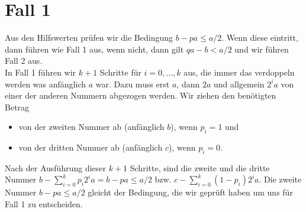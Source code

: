 \section{Fall 1} \label{case-1}
Aus den Hilfswerten prüfen wir die Bedingung $b-pa \leq a/2$. Wenn diese eintritt, dann führen wie Fall 1 aus, wenn nicht, dann gilt $qa-b < a/2$ und wir führen Fall 2 aus. \\
In Fall 1 führen wir $k+1$ Schritte für $i=0, ..., k$ aus, die immer das verdoppeln werden was anfänglich $a$ war. Dazu muss erst $a$, dann $2a$ und allgemein $2^ia$ von einer der anderen Nummern abgezogen werden. 
Wir ziehen den benötigten Betrag 
\begin{itemize}
    \item von der zweiten Nummer ab (anfänglich $b$), wenn $p_i = 1$ und
    \item von der dritten Nummer ab (anfänglich $c$), wenn $p_i = 0$.
\end{itemize}

Nach der Ausführung dieser $k+1$ Schritte, sind die zweite und die dritte Nummer $b- \sum_{i=0}^{k} p_i2^ia = b-pa \leq a/2$ bzw. $c- \sum_{i=0}^{k} (1-p_i)2^ia$. Die zweite Nummer $b-pa \leq a/2$ gleicht der Bedingung, die wir geprüft haben um uns für Fall 1 zu entscheiden.
